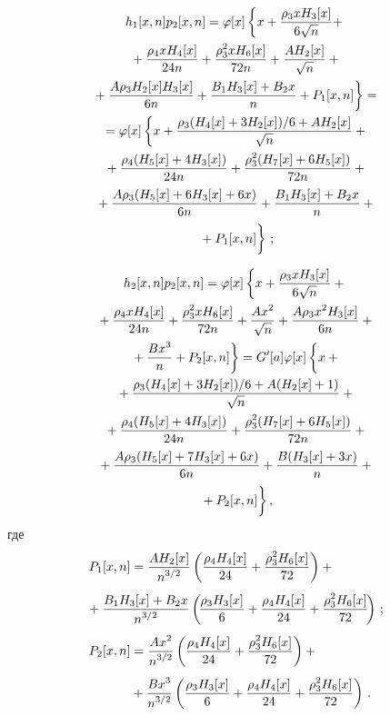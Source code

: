 \begin{multicols}{2}
 \noindent
 \begin{multline*}
h_1[x,n] p_2[x,n]=\varphi[x]
 \left\{x+\fr{\rho_3 x H_3[x]}{6\sqrt{n}}+\right.{}\\
{} +\fr{\rho_4 x H_4[x]}{24n}
 + \fr{\rho_3^2 x H_6[x]}{72n}+
 \fr{A H_2[x]}{\sqrt{n}}+{}\\
\left. {}+
\fr{A\rho_3 H_2[x]H_3[x]}{6n}+\fr{B_1 H_3[x]+B_2
 x}{n}+P_1[x,n]
 \right\}={}
\\
{}=\varphi[x]
 \left\{x+\fr{\rho_3 (H_4[x]+3H_2[x])/6+AH_2[x]}{\sqrt{n}}
 +{} \right.\\
 {}+\fr{\rho_4 (H_5[x]+4H_3[x])}{24n}+\fr{\rho_3^2 (H_7[x]+6H_5[x])}{72n}
 +{}\\
 {}+\fr{A \rho_3 (H_5[x]+6H_3[x]+6x)}{6n}
 +\fr{B_1 H_3[x]+B_2 x}{n}+{}\\
\left. {}+P_1[x,n]
\vphantom{\fr{A \rho_3 (H_5[x]+6H_3[x]+6x)}{6n}}
\right\}\,;
 \end{multline*}
 
 \vspace*{-12pt}
 
 \noindent
 \begin{multline*}
h_2[x,n] p_2[x,n]=\varphi[x]
 \left\{x+\fr{\rho_3 x H_3[x]}{6\sqrt{n}}+{}\right.
\\ 
{} +\fr{\rho_4 x H_4[x]}{24n}
 +\fr{\rho_3^2 x H_6[x]}{72n}+\fr{A x^2}{\sqrt{n}}+
\fr{A\rho_3 x^2 H_3[x]}{6n}+{}\\
\left.{}+\fr{B x^3}{n}+P_2[x,n]
 \right\}={}
G'[a]\varphi[x]
 \left\{
 \vphantom{\fr{\rho_3 (H_4[x]+3H_2[x])/6+A(H_2[x]+1)}{\sqrt{n}}}
 x+{}\right.\\
 {}+\fr{\rho_3 (H_4[x]+3H_2[x])/6+A(H_2[x]+1)}{\sqrt{n}}+{}\\
{} +\fr{\rho_4 (H_5[x]+4H_3[x])}{24n}+
\fr{\rho_3^2 (H_7[x]+6H_5[x])}{72n}+{}\\
{}+
\fr{A \rho_3 (H_5[x]+7H_3[x]+6x)}{6n}
 +\fr{B (H_3[x]+3x)}{n}+{}\\
\left. {}+P_2[x,n]
\vphantom{\fr{\rho_3 (H_4[x]+3H_2[x])/6+A(H_2[x]+1)}{\sqrt{n}}}
\right\},
 \end{multline*}
 где
 \begin{align*}
 P_1[x,n]&=\fr{AH_2[x]}{n^{3/2}}
 \left( \fr{\rho_4 H_4[x]}{24}+\fr{\rho_3^2 H_6[x]}{72}\right)+{}
\\[3pt]
 &\hspace*{-12.1mm}{}+\fr{B_1 H_3[x]+B_2 x}{n^{3/2}}
 \left( \!\fr{\rho_3 H_3[x]}{6}+\fr{\rho_4 H_4[x]}{24}
 +\fr{\rho_3^2 H_6[x]}{72}\!\right)\,;
\\[3pt]
 P_2[x,n]&=\fr{A x^2}{n^{3/2}}
 \left( \fr{\rho_4 H_4[x]}{24}+\fr{\rho_3^2 H_6[x]}{72}\right)+{}
\\[3pt]
 &{}+\fr{B x^3}{n^{3/2}}
 \left( \fr{\rho_3 H_3[x]}{6}+\fr{\rho_4 H_4[x]}{24}
 +\fr{\rho_3^2 H_6[x]}{72}\right)\,.
 \end{align*}


\end{multicols}
